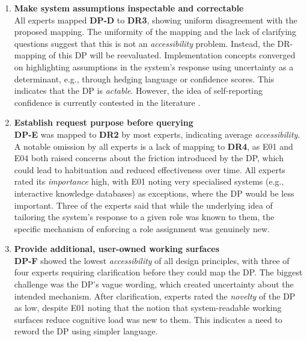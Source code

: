 \begin{enumerate}[label=\textbf{DP-\Alph*}, leftmargin=*]
    \item \textbf{Make system assumptions inspectable and correctable} \\
        All experts mapped \textbf{DP-D} to \textbf{DR3}, showing uniform disagreement with the proposed mapping. The uniformity of the mapping and the lack of clarifying questions suggest that this is not an \textit{accessibility} problem. Instead, the \ac{DR}-mapping of this \ac{DP} will be reevaluated. Implementation concepts converged on highlighting assumptions in the system’s response using uncertainty as a determinant, e.g., through hedging language or confidence scores. This indicates that the \ac{DP} is \textit{actable}. However, the idea of self-reporting confidence is currently contested in the literature \parencite{Kapoor2024}.

    \item \textbf{Establish request purpose before querying} \\
        \textbf{DP-E} was mapped to \textbf{DR2} by most experts, indicating average \textit{accessibility}. A notable omission by all experts is a lack of mapping to \textbf{DR4}, as E01 and E04 both raised concerns about the friction introduced by the \ac{DP}, which could lead to habituation and reduced effectiveness over time.  All experts rated its \textit{importance} high, with E01 noting very specialised systems (e.g., interactive knowledge databases) as exceptions, where the \ac{DP} would be less important. Three of the experts said that while the underlying idea of tailoring the system's response to a given role was known to them, the specific mechanism of enforcing a role assignment was genuinely new.

    \item \textbf{Provide additional, user-owned working surfaces} \\
        \textbf{DP-F} showed the lowest \textit{accessibility} of all design principles, with three of four experts requiring clarification before they could map the \ac{DP}. The biggest challenge was the \ac{DP}'s vague wording, which created uncertainty about the intended mechanism. After clarification, experts rated the \textit{novelty} of the \ac{DP} as low, despite E01 noting that the notion that system-readable working surfaces reduce cognitive load was new to them. This indicates a need to reword the \ac{DP} using simpler language.
\end{enumerate}

